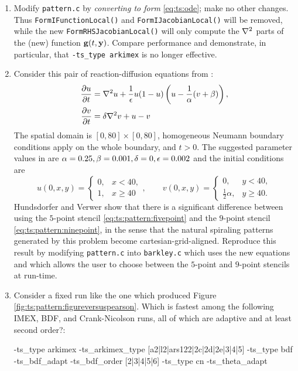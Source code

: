 \begin{enumerate}
\item \label{exer:ts:patternrhsonlyform}  Modify \texttt{pattern.c} by \emph{converting to form} \eqref{eq:ts:ode}; make no other changes.  Thus \texttt{FormIFunctionLocal()} and \texttt{FormIJacobianLocal()} will be removed, while the new \texttt{FormRHSJacobianLocal()} will only compute the $\nabla^2$ parts of the (new) function $\mathbf{g}(t,\mathbf{y})$.  Compare performance and demonstrate, in particular, that \texttt{-ts\_type arkimex} is no longer effective.

\item \label{exer:ts:barkley}  Consider this pair of reaction-diffusion equations from \citep{Barkley1995}:
\begin{align}
\frac{\partial u}{\partial t} &= \nabla^2 u + \frac{1}{\epsilon} u (1-u) \left(u - \frac{1}{\alpha} (v + \beta)\right), \label{eq:ts:pattern:barkleypde} \\
\frac{\partial v}{\partial t} &= \delta \nabla^2 v + u - v \notag
\end{align}
The spatial domain is $[0,80]\times[0,80]$, homogeneous Neumann boundary conditions apply on the whole boundary, and $t>0$.  The suggested parameter values in \citep[section III.6]{HundsdorferVerwer2003} are $\alpha=0.25,\beta=0.001,\delta=0,\epsilon=0.002$ and the initial conditions are
    $$u(0,x,y) = \begin{cases} 0, & x < 40, \\ 1, & x \ge 40 \end{cases}, \qquad
      v(0,x,y) = \begin{cases} 0, & y < 40, \\ \frac{1}{2}\alpha, & y \ge 40.\end{cases}$$
Hundsdorfer and Verwer show that there is a significant difference between using the $5$-point stencil \eqref{eq:ts:pattern:fivepoint} and the $9$-point stencil \eqref{eq:ts:pattern:ninepoint}, in the sense that the natural spiraling patterns generated by this problem become cartesian-grid-aligned.  Reproduce this result by modifying \texttt{pattern.c} into \texttt{barkley.c} which uses the new equations and which allows the user to choose between the $5$-point and $9$-point stencils at run-time.

\item \label{exer:ts:patternperformancestudy}  Consider a fixed run like the one which produced Figure \ref{fig:ts:pattern:figureversuspearson}.  Which is fastest among the following IMEX, BDF, and Crank-Nicolson runs, all of which are adaptive and at least second order?:
\begin{code}
-ts_type arkimex -ts_arkimex_type [a2|l2|ars122|2c|2d|2e|3|4|5]
-ts_type bdf -ts_bdf_adapt -ts_bdf_order [2|3|4|5|6]
-ts_type cn -ts_theta_adapt
\end{code}

\end{enumerate}

